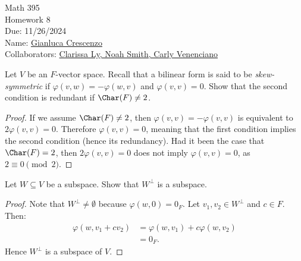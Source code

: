 \documentclass[11pt,twoside,openany]{memoir}
\begin{document}
\begin{center}
{ \Large Math 395 \\[0.1in]Homework 8\\[0.1in]
Due: 11/26/2024}\\[.25in]
{ Name:} {\underline{Gianluca Crescenzo\hspace*{2in}}}\\[0.15in]
{ Collaborators:} {\underline{{Clarissa Ly, Noah Smith, Carly Venenciano\hspace*{1in}}}} \\
\end{center}
\vspace{4pt}
    \begin{exercise}
        Let $V$ be an $F$-vector space. Recall that a bilinear form is said to be \textit{skew-symmetric} if $\varphi(v,w) = -\varphi(w,v)$ and $\varphi(v,v) = 0$. Show that the second condition is redundant if $\Char(F) \neq 2$.
    \end{exercise}
        \begin{proof}
            If we assume $\Char(F) \neq 2$, then $\varphi(v,v) = -\varphi(v,v)$ is equivalent to $2\varphi(v,v) = 0$. Therefore $\varphi(v,v) = 0$, meaning that the first condition implies the second condition (hence its redundancy). Had it been the case that $\Char(F) = 2$, then $2\varphi(v,v) = 0$ does not imply $\varphi(v,v) = 0$, as $2 \equiv 0 \pmod{2}$.
        \end{proof}
    \begin{exercise}
        Let $W \subseteq V$ be a subspace. Show that $W^\bot$ is a subspace.
    \end{exercise}
        \begin{proof}
            Note that $W^\bot \neq \emptyset$ because $\varphi(w,0) = 0_F$. Let $v_1,v_2 \in W^\bot$ and $c \in F$. Then:
                \begin{equation*}
                \begin{split}
                    \varphi(w,v_1 + cv_2) 
                    &= \varphi(w,v_1) + c\varphi(w,v_2) \\
                    &= 0_F.
                \end{split}
                \end{equation*}
            Hence $W^\bot$ is a subspace of $V$.
        \end{proof}
\end{document}
